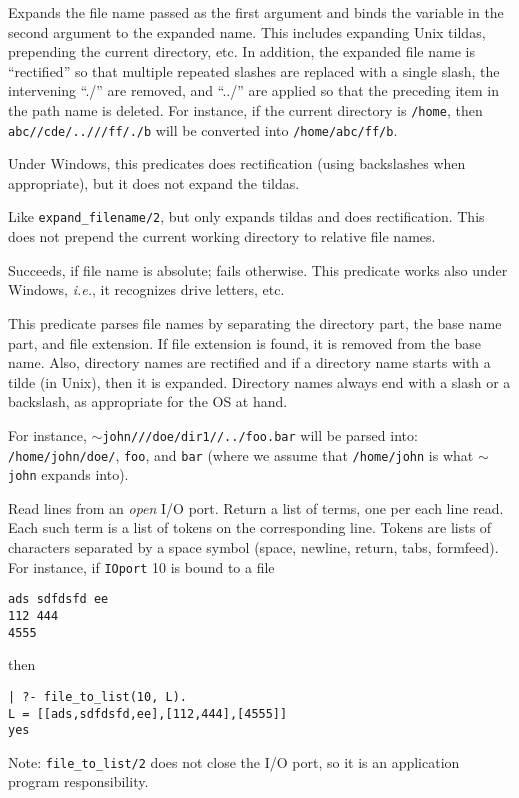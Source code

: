 \begin{description}

Expands the file name passed as the first argument and binds the variable
in the second argument to the expanded name. This includes expanding Unix
tildas, prepending the current directory, etc. In addition, the expanded
file name is ``rectified'' so that multiple repeated slashes are replaced
with a single slash, the intervening ``./'' are removed, and ``../'' are
applied so that the preceding item in the path name is deleted. For
instance, if the current directory is {\tt /home}, then {\tt
  abc//cde/..///ff/./b} will be converted into {\tt /home/abc/ff/b}.

Under Windows, this predicates does rectification (using
backslashes when appropriate), but it does not expand the tildas.

Like {\tt expand\_filename/2}, but only expands tildas and does
rectification. This does not prepend the current working directory to
relative file names.

  Succeeds, if file name is absolute; fails
otherwise.  This predicate works also under Windows, {\it
i.e.}, it recognizes drive letters, etc.

This predicate parses file names by separating the directory part, the base
name part, and file extension. If file extension is found, it is removed
from the base name. Also, directory names are rectified and if a directory
name starts with a tilde (in Unix), then it is expanded. Directory names
always end with a slash or a backslash, as appropriate for the OS at hand.

For instance, {\tt $\sim$john///doe/dir1//../foo.bar} will be parsed into:
{\tt /home/john/doe/}, {\tt foo}, and {\tt bar} (where we assume that    
{\tt /home/john} is what {\tt $\sim$john} expands into).  

Read lines from an \emph{open} I/O port. Return a
list of terms, one per each line read. Each such term is a list of tokens
on the corresponding line.  Tokens are lists of characters separated by a
space symbol (space, newline, return, tabs, formfeed). For instance, if
{\tt IOport} 10 is bound to a file
\begin{verbatim}
ads sdfdsfd ee
112 444
4555  
\end{verbatim}
then
\begin{verbatim}
| ?- file_to_list(10, L).  
L = [[ads,sdfdsfd,ee],[112,444],[4555]]
yes
\end{verbatim}
Note: {\tt file\_to\_list/2} does not close the I/O port, so it is an
application program responsibility.



\end{description}
